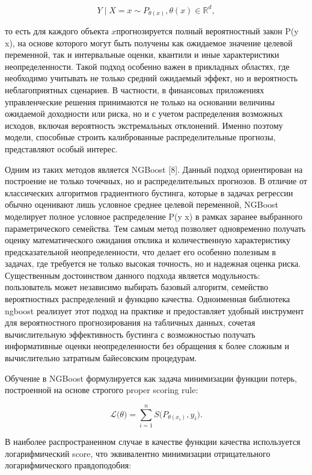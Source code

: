\documentclass[
]{article}
\begin{document}
\[Y \mid X = x \sim P_{\theta(x)},\theta(x) \in \mathbb{R}^{d},\]

то есть для каждого объекта \(x\)прогнозируется полный вероятностный закон P(y \textbar{} x), на основе которого могут быть получены как ожидаемое значение целевой переменной, так и интервальные оценки, квантили и иные характеристики неопределенности. Такой подход особенно важен в прикладных областях, где необходимо учитывать не только средний ожидаемый эффект, но и вероятность неблагоприятных сценариев. В частности, в финансовых приложениях управленческие решения принимаются не только на основании величины ожидаемой доходности или риска, но и с учетом распределения возможных исходов, включая вероятность экстремальных отклонений. Именно поэтому модели, способные строить калиброванные распределительные прогнозы, представляют особый интерес.

Одним из таких методов является NGBoost {[}8{]}. Данный подход ориентирован на построение не только точечных, но и распределительных прогнозов. В отличие от классических алгоритмов градиентного бустинга, которые в задачах регрессии обычно оценивают лишь условное среднее целевой переменной, NGBoost моделирует полное условное распределение P(y \textbar{} x) в рамках заранее выбранного параметрического семейства. Тем самым метод позволяет одновременно получать оценку математического ожидания отклика и количественную характеристику предсказательной неопределенности, что делает его особенно полезным в задачах, где требуется не только высокая точность, но и надежная оценка риска. Существенным достоинством данного подхода является модульность: пользователь может независимо выбирать базовый алгоритм, семейство вероятностных распределений и функцию качества. Одноименная библиотека ngboost реализует этот подход на практике и предоставляет удобный инструмент для вероятностного прогнозирования на табличных данных, сочетая вычислительную эффективность бустинга с возможностью получать информативные оценки неопределенности без обращения к более сложным и вычислительно затратным байесовским процедурам.

Обучение в NGBoost формулируется как задача минимизации функции потерь, построенной на основе строгого proper scoring rule:

\[\mathcal{L(}\theta) = \sum_{i = 1}^{n}{S(}P_{\theta(x_{i})},y_{i}).\]

В наиболее распространенном случае в качестве функции качества используется логарифмический score, что эквивалентно минимизации отрицательного логарифмического правдоподобия:
\end{document}

